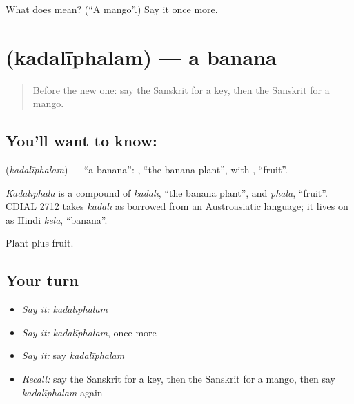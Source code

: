 \begin{tcolorbox}[breakable,colback=teal!4,colframe=teal!35!black,title={Before you move on}]
What does  mean? (\textquotedblleft{}A mango\textquotedblright{}.) Say it once more.
\end{tcolorbox}
\section[\texorpdfstring{\sk{कदलीफलम्} (kadalīphalam)}{कदलीफलम् (kadalīphalam)}]{ (kadalīphalam) — a banana}

\label{lesson:SA-C78-banana}



\begin{quote}
Before the new one: say the Sanskrit for a key, then the Sanskrit for a mango.
\end{quote}

\subsection*{You'll want to know: }
\textbf{} (\emph{kadalīphalam}) — \textquotedblleft{}a banana\textquotedblright{}: \textbf{}, \textquotedblleft{}the banana plant\textquotedblright{}, with \textbf{}, \textquotedblleft{}fruit\textquotedblright{}.

\begin{cousinweb}
\emph{Kadalīphala} is a compound of \emph{kadalī}, \textquotedblleft{}the banana plant\textquotedblright{}, and \emph{phala}, \textquotedblleft{}fruit\textquotedblright{}. CDIAL 2712 takes \emph{kadalī} as borrowed from an Austroasiatic language; it lives on as Hindi \emph{kelā}, \textquotedblleft{}banana\textquotedblright{}.
\end{cousinweb}

\begin{grammarlens}[title={What you've built}]
Plant plus fruit.
\end{grammarlens}

\subsection*{Your turn}
\begin{itemize}
\raggedright
  \item \emph{Say it:} \emph{kadalīphalam}
  \item \emph{Say it:} \emph{kadalīphalam}, once more
  \item \emph{Say it:} say \emph{kadalīphalam}
  \item \emph{Recall:} say the Sanskrit for a key, then the Sanskrit for a mango, then say \emph{kadalīphalam} again
\end{itemize}

